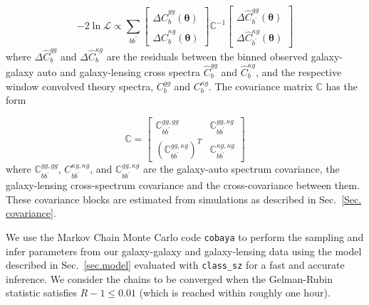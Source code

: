\documentclass[twocolumn]{aastex631}
\begin{document}
{\begin{equation}
    -2\ln\mathcal{L}\propto\sum_{bb^\prime}\begin{bmatrix}
\Delta{\hat{C}^{gg}_b(\boldsymbol{\theta})} \\
\Delta{\hat{C}^{\kappa{g}}_b(\boldsymbol{\theta})}
\end{bmatrix}\mathbb{C}^{-1}\begin{bmatrix}
\Delta{\hat{C}^{gg}_{b^\prime}(\boldsymbol{\theta})} \\
\Delta{\hat{C}^{\kappa{g}}_{b^\prime}(\boldsymbol{\theta})}
\end{bmatrix}
\end{equation}
where $\Delta\hat{C}^{gg}_b$ and $\Delta{\hat{C}^{\kappa{g}}_b}$ are the residuals between the binned observed galaxy-galaxy auto and galaxy-lensing cross spectra $\hat{C}^{gg}_b$ and $\hat{C}^{\kappa{g}}_b$, and the respective window convolved theory spectra, ${C}^{gg}_b$ and ${C}^{\kappa{g}}_b$. The covariance matrix $\mathbb{C}$
has the form

\begin{equation}
    \mathbb{C}=\begin{bmatrix}
        \mathbb{C}^{gg,gg}_{bb^\prime}&\mathbb{C}^{gg,\kappa{g}}_{bb^\prime}\\(\mathbb{C}^{gg,\kappa{g}}_{bb^\prime})^T&\mathbb{C}^{\kappa{g},\kappa{g}}_{bb^\prime}
    \end{bmatrix}
\end{equation}
where $\mathbb{C}^{gg,gg}_{bb^\prime}$, ${C}^{\kappa{g},\kappa{g}}_{bb^\prime}$, and $\mathbb{C}^{gg,\kappa{g}}_{bb^\prime}$ are the galaxy-auto spectrum covariance, the galaxy-lensing cross-spectrum covariance and the cross-covariance between them. These covariance blocks are estimated from simulations as described in Sec.~\ref{Sec. covariance}.

We use the Markov Chain Monte Carlo code \texttt{cobaya} \citep{Torrado_2021} to perform the sampling and infer parameters from our galaxy-galaxy and galaxy-lensing data using the model described in Sec.~\ref{sec.model} evaluated with \texttt{class\_sz} for a fast and accurate inference. We consider the chains to be converged when the Gelman-Rubin statistic \citep{Gelman1992,Gelman1998} satisfies $R-1\leq0.01$ (which is reached within roughly one hour). 

}
\end{document}
